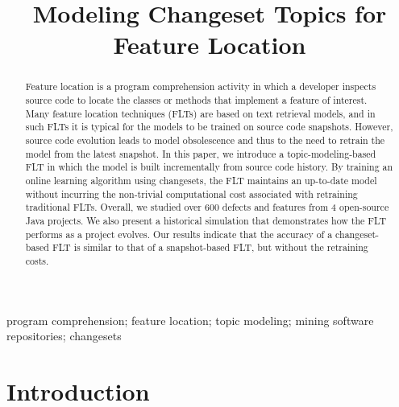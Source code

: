\documentclass[conference]{IEEEtran}
\begin{document}
\title{Modeling Changeset Topics for Feature Location}
\author{
    \and
}


\maketitle

\begin{abstract}
Feature location is a program comprehension activity in which a developer
inspects source code to locate the classes or methods that implement a feature
of interest. Many feature location techniques (FLTs) are based on text retrieval
models, and in such FLTs it is typical for the models to be trained on source
code snapshots. However, source code evolution leads to model obsolescence and
thus to the need to retrain the model from the latest snapshot. In this paper,
we introduce a topic-modeling-based FLT in which the model is built
incrementally from source code history. By training an online learning algorithm
using changesets, the FLT maintains an up-to-date model without incurring the
non-trivial computational cost associated with retraining traditional FLTs.
Overall, we studied over 600 defects and features from 4 open-source Java
projects. We also present a historical simulation that demonstrates how the FLT
performs as a project evolves. Our results indicate that the accuracy of a
changeset-based FLT is similar to that of a snapshot-based FLT, but without the
retraining costs.
\end{abstract}

\begin{IEEEkeywords}
program comprehension;
feature location;
topic modeling;
mining software repositories;
changesets
\end{IEEEkeywords}

\section{Introduction}
\label{sec:intro}

\end{document}
